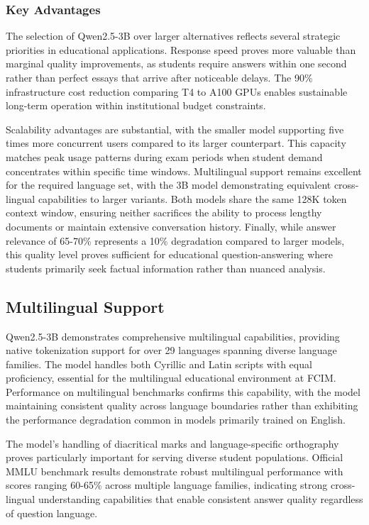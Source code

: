 \documentclass[12pt,a4paper]{article}
\begin{document}
\subsubsection{Key Advantages}

The selection of Qwen2.5-3B over larger alternatives reflects several strategic priorities in educational applications. Response speed proves more valuable than marginal quality improvements, as students require answers within one second rather than perfect essays that arrive after noticeable delays. The 90\% infrastructure cost reduction comparing T4 to A100 GPUs enables sustainable long-term operation within institutional budget constraints.

Scalability advantages are substantial, with the smaller model supporting five times more concurrent users compared to its larger counterpart. This capacity matches peak usage patterns during exam periods when student demand concentrates within specific time windows. Multilingual support remains excellent for the required language set, with the 3B model demonstrating equivalent cross-lingual capabilities to larger variants. Both models share the same 128K token context window, ensuring neither sacrifices the ability to process lengthy documents or maintain extensive conversation history. Finally, while answer relevance of 65-70\% represents a 10\% degradation compared to larger models, this quality level proves sufficient for educational question-answering where students primarily seek factual information rather than nuanced analysis.

\subsection{Multilingual Support}

Qwen2.5-3B demonstrates comprehensive multilingual capabilities, providing native tokenization support for over 29 languages spanning diverse language families. The model handles both Cyrillic and Latin scripts with equal proficiency, essential for the multilingual educational environment at FCIM. Performance on multilingual benchmarks confirms this capability, with the model maintaining consistent quality across language boundaries rather than exhibiting the performance degradation common in models primarily trained on English.

The model's handling of diacritical marks and language-specific orthography proves particularly important for serving diverse student populations. Official MMLU benchmark results demonstrate robust multilingual performance with scores ranging 60-65\% across multiple language families, indicating strong cross-lingual understanding capabilities that enable consistent answer quality regardless of question language.
\end{document}
